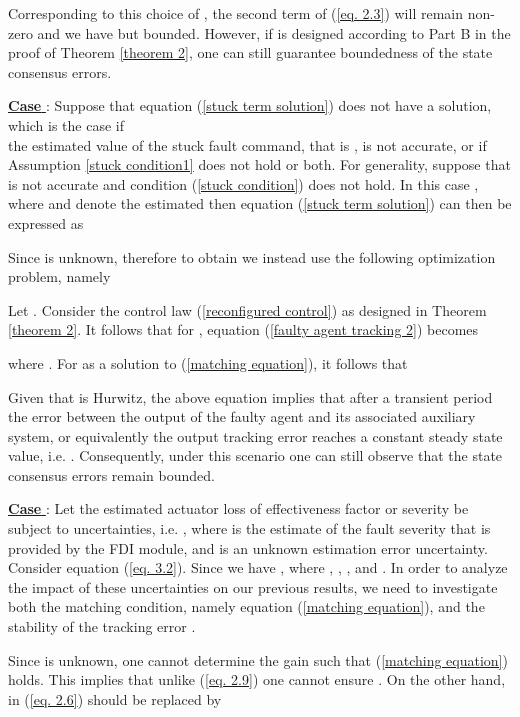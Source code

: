 \documentclass[12pt,draftcls,onecolumn]{IEEEtran}
\newcommand{\RNum}[1]{\uppercase\expandafter{\romannumeral #1\relax}}
\begin{document}
Corresponding to this choice of , the second  term of   (\ref{eq. 2.3}) will remain non-zero and we have  but bounded. However, if   is designed according to Part B in the proof of Theorem \ref{theorem 2},  one can still guarantee boundedness of the state consensus errors.

\underline{\textbf{Case \RNum{3}}}: Suppose that equation (\ref{stuck term solution}) does not have a solution, which is the case if \\
the estimated value of the stuck fault command, that is , is not accurate, or if Assumption  \ref{stuck condition1} does not hold or both. For generality, suppose that   is not accurate and condition (\ref{stuck condition}) does not hold.  
In this case , where  and  denote the estimated then equation (\ref{stuck term solution}) can then be expressed as

Since  is unknown, therefore to obtain    we instead use the following optimization problem, namely

Let . 
Consider the control law (\ref{reconfigured control}) as designed in Theorem \ref{theorem 2}. It follows that for , equation (\ref{faulty agent tracking 2}) becomes 

where . For  as a solution to (\ref{matching equation}), it follows that

Given that  is Hurwitz, the above equation implies that after a transient period the error between the output of the faulty agent and its associated auxiliary system, or equivalently the output tracking error reaches a constant steady state value, i.e. . Consequently, under this scenario one can still observe that the state consensus errors remain bounded. \par


\underline{\textbf{Case \RNum{4}}}: Let the estimated  actuator loss of effectiveness factor or severity be subject to uncertainties, i.e. , where  is the estimate of the fault severity that is provided by the FDI module, and  is an unknown estimation error uncertainty. 
Consider equation (\ref{eq. 3.2}). Since  we have , where 
,  ,  ,  and . 
In order to analyze the impact of these uncertainties on our previous results, we need to investigate both the matching condition, namely equation (\ref{matching equation}), and the stability of the tracking error . \par
Since  is unknown, one cannot determine the gain  such that (\ref{matching equation}) holds. This implies that unlike (\ref{eq. 2.9}) one cannot ensure .  
On the other hand,  in  (\ref{eq. 2.6}) should be replaced by
\end{document}
